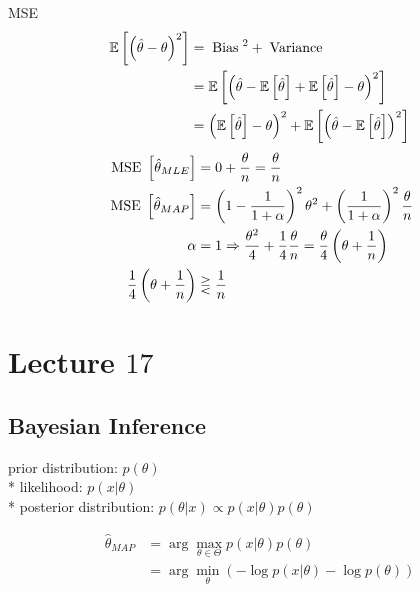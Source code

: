 \documentclass{article}
\begin{document}
MSE
\begin{align*}
\mathbb{E}\left[\left(\hat{\theta} - \theta\right)^{2}\right] &= \text{\;Bias\;}^{2} + \text{\;Variance\;}
\\ &= \mathbb{E}\left[\left(\hat{\theta} - \mathbb{E}\left[\hat{\theta}\right] + \mathbb{E}\left[\hat{\theta}\right] - \theta\right)^{2}\right]
\\ &= \left(\mathbb{E}\left[\hat{\theta}\right] - \theta\right)^{2} + \mathbb{E}\left[\left(\hat{\theta} - \mathbb{E}\left[\hat{\theta}\right]\right)^{2}\right]
\end{align*}
\begin{align*}
\text{\;MSE\;} \left[\hat{\theta}_{MLE}\right] &= 0 + \dfrac{\theta}{n} = \dfrac{\theta}{n}
\\ \text{\;MSE\;} \left[\hat{\theta}_{MAP}\right] &= \left(1 - \dfrac{1}{1 + \alpha}\right)^{2} \theta^{2} + \left(\dfrac{1}{1 + \alpha}\right)^{2} \dfrac{\theta}{n}
\\ \alpha &= 1 \Rightarrow  \dfrac{\theta^{2}}{4} + \dfrac{1}{4} \dfrac{\theta}{n} = \dfrac{\theta}{4} \left(\theta + \dfrac{1}{n}\right)
\\ \dfrac{1}{4} \left(\theta + \dfrac{1}{n}\right) &  \gtreqless \dfrac{1}{n}
\end{align*}





\section{Lecture $17$} 


\subsection{Bayesian Inference}
prior distribution: $p\left(\theta\right) $
\\* likelihood: $p\left(x | \theta\right) $
\\* posterior distribution: $p\left(\theta | x\right)  \propto p\left(x | \theta\right) p\left(\theta\right)$

\begin{align*}
\hat{\theta}_{MAP} &= \arg\displaystyle\max_{\theta \in \Theta} p\left(x | \theta\right) p\left(\theta\right)
\\ &= \arg\displaystyle\min_{\theta} \left(- \log p\left(x | \theta\right) - \log p\left(\theta\right)\right)
\end{align*}
\end{document}
